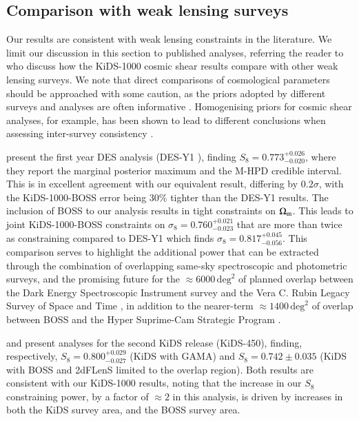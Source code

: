 \subsection{Comparison with weak lensing surveys}
\label{sec:WL_comp}
Our results are consistent with weak lensing constraints in the literature.   We limit our discussion in this section to published \tttp analyses, referring the reader to \citet{asgari/etal:inprep} who discuss how the KiDS-1000 cosmic shear results compare with other weak lensing surveys.   We note that direct comparisons of cosmological parameters should be approached with some caution, as the priors adopted by different surveys and analyses are often informative \citep[see section 6.1 in][]{joachimi/etal:inprep}.   Homogenising priors for cosmic shear analyses, for example, has been shown to lead to different conclusions when assessing inter-survey consistency \citep{chang/etal:2019, joudaki/etal:2020, asgari/etal:2020_KD}.   

\citet{abbott/etal:2018} present the first year \tttp DES analysis (DES-Y1 ), finding $S_8=0.773^{+0.026}_{-0.020}$, where they report the marginal posterior maximum and the M-HPD credible interval.   
This is in excellent agreement with our equivalent result, differing by $0.2\sigma$, with the KiDS-1000-BOSS error being 30\% tighter than the DES-Y1 results.  The inclusion of BOSS to our \tttp analysis results in tight constraints on $\Omega_{\rm m}$.  
This leads to joint KiDS-1000-BOSS constraints on $\sigma_8=0.760^{+0.021}_{-0.023}$ that are more than twice as constraining compared to DES-Y1 which finds $\sigma_8=0.817^{+0.045}_{-0.056}$. 
This comparison serves to highlight the additional power that can be extracted through the combination of overlapping same-sky spectroscopic and photometric surveys,  and the promising future for the $\approx\!6000\,\mathrm{deg}^{2}$  of planned overlap between the Dark Energy Spectroscopic Instrument survey \citep{DESI/etal:2016} and the Vera C. Rubin Legacy Survey of Space and Time \citep{lsst/etal:2009}, in addition to the nearer-term $\approx\!1400\,\mathrm{deg}^{2}$ of overlap between BOSS and the Hyper Suprime-Cam Strategic Program \citep[HSC,][]{aihara/etal:2019}. 

\citet{vanuitert/etal:2018} and \citet{joudaki/etal:2018} present \tttp analyses for the second KiDS release (KiDS-450), finding, respectively, $S_8 = 0.800_{-0.027}^{+0.029}$ (KiDS with GAMA) and $S_8 = 0.742 \pm 0.035$ (KiDS with BOSS and 2dFLenS limited to the overlap region). 
Both results are consistent with our KiDS-1000 results, noting that the increase in our $S_8$ constraining power, by a factor of $\approx\! 2$ in this analysis, is driven by increases in both the KiDS survey area, and the BOSS survey area.  

